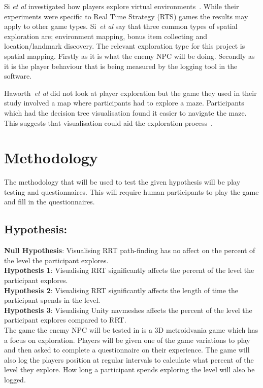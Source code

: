 \documentclass[journal]{IEEEtran}
\begin{document}
Si \textit{et al} investigated how players explore virtual environments~\cite{si2017}. While their experiments were specific to Real Time Strategy (RTS) games the results may apply to other game types. Si~\textit{et al} say that three common types of spatial exploration are; environment mapping, bonus item collecting and location/landmark discovery. The relevant exploration type for this project is spatial mapping. Firstly as it is what the enemy NPC will be doing.  Secondly as it is the player behaviour that is being measured by the logging tool in the software.

Haworth~\textit{et al} did not look at player exploration but the game they used in their study involved a map where participants had to explore a maze. Participants which had the decision tree visualisation found it easier to navigate the maze. This suggests that visualisation could aid the exploration process~\cite{Haworth2010}.

\section{Methodology}
The methodology that will be used to test the given hypothesis will be play testing and questionnaires. This will require human participants to play the game and fill in the questionnaires. 

\subsection{Hypothesis:}
\textbf{Null Hypothesis}: Visualising RRT path-finding has no affect on the percent of the level the participant explores. \\
\textbf{Hypothesis 1}: Visualising RRT significantly affects the percent of the level the participant explores. \\
\textbf{Hypothesis 2}: Visualising RRT significantly affects the length of time the participant spends in the level. \\
\textbf{Hypothesis 3}:  Visualising Unity navmeshes affects the percent of the level the participant explores compared to RRT. \\


The game the enemy NPC will be tested in is a 3D metroidvania game which has a focus on exploration. Players will be given one of the game variations to play and then asked to complete a questionnaire on their experience. The game will also log the players position at regular intervals to calculate what percent of the level they explore. How long a participant spends exploring the level will also be logged.
  
\end{document}

